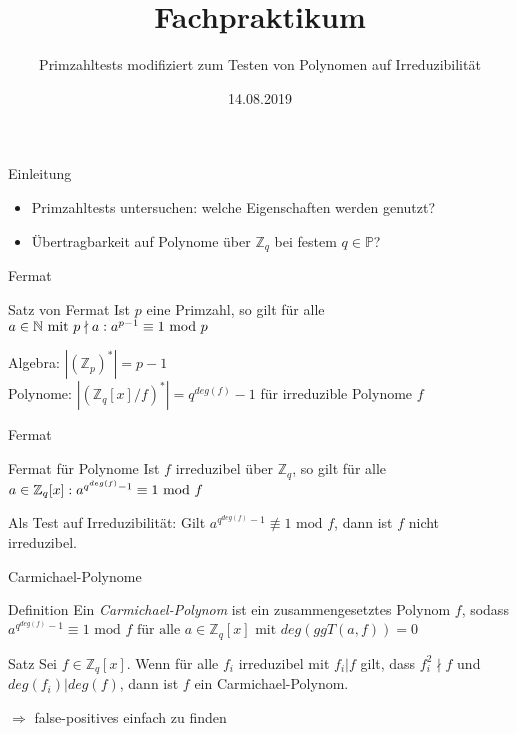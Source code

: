 \documentclass[german,10pt,xcolor=colortbl,compress]{beamer}%
\title{Fachpraktikum}
\subtitle{Primzahltests modifiziert zum Testen von Polynomen auf Irreduzibilität}
\date[]{14.08.2019} %
\newcommand{\ZZ}{\mathbb{Z}}
\newcommand{\NN}{\mathbb{N}}
\newcommand{\PP}{\mathbb{P}}
\begin{document}
	\maketitle
		
	\begin{frame}{Einleitung}	
		\begin{itemize}
			\item Primzahltests untersuchen: welche Eigenschaften werden genutzt?
			\item Übertragbarkeit auf Polynome über $\ZZ_q$ bei festem $q \in \PP$?	
		\end{itemize}
	\end{frame}
	
	
	\begin{frame}{Fermat}
		\begin{block}{Satz von Fermat}
			Ist $p$ eine Primzahl, so gilt für alle $ a \in \NN \text{ mit } p \nmid a:  
			\newline	
			a^{p-1} \equiv 1 \text{ mod } p $	
		\end{block}
	
		\medskip
		Algebra: $|(\ZZ_p)^*| = p-1$ \\
		\medskip
		Polynome: $ |(\ZZ_q[x]/f)^*| = q^{deg(f)}-1 $ für irreduzible Polynome $f$	
	\end{frame}
	
	
	\begin{frame}{Fermat}
		\begin{block}{Fermat für Polynome}
			Ist $f$ irreduzibel über $\ZZ_q$, so gilt für alle $ a \in \ZZ_q[x]:
			 \newline a^{q^{deg(f)}-1}  \equiv 1 \text{ mod } f$
		\end{block}
		\vspace{0.5cm}
		Als Test auf Irreduzibilität: Gilt $a^{q^{deg(f)}-1}  \not\equiv 1 \text{ mod } f$, dann ist $f$ nicht irreduzibel.
	\end{frame}


	\begin{frame}{Carmichael-Polynome}
		\begin{block}{Definition}
			Ein \emph{Carmichael-Polynom} ist ein zusammengesetztes Polynom $f$, sodass $a^{q^{deg(f)}-1}  \equiv 1 \text{ mod } f \text{ für alle } a \in \ZZ_q[x] \text{ mit } deg(ggT(a,f))=0$
		\end{block}
		\begin{block}{Satz}
			Sei $f\in \ZZ_q[x]$. Wenn für alle $f_i$ irreduzibel mit $f_i|f$ gilt, dass $f_i^2 \nmid f$ und $deg(f_i)|deg(f)$, dann ist $f$ ein Carmichael-Polynom.
		\end{block}
		\vspace{0.5cm}
		$\Rightarrow$ false-positives einfach zu finden
	\end{frame}
\end{document}
